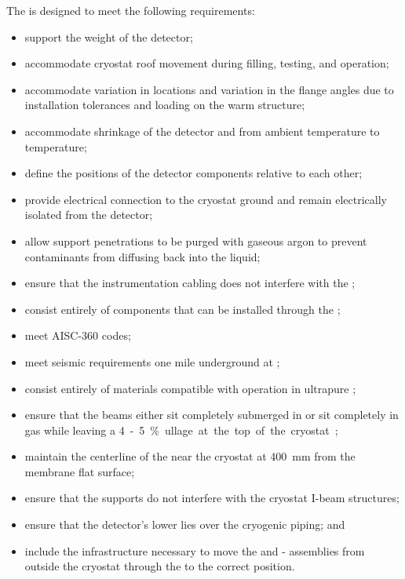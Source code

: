 The  is designed to meet the following  requirements:
\begin{itemize}
\item support the weight of the detector;
\item accommodate cryostat roof movement during filling, testing, and operation;
\item accommodate variation in \fdth locations and
  variation in the flange angles due to installation tolerances and
  loading on the warm structure;
\item accommodate shrinkage of the detector and  from ambient
  temperature to  temperature;
\item define the positions of the detector components relative to each other; 
\item provide electrical connection to the cryostat ground and remain electrically isolated from the detector;
\item allow support penetrations to be purged with gaseous argon to prevent contaminants from diffusing back into the liquid; 
\item ensure that the instrumentation cabling does not interfere with the ;
\item consist entirely of components that can  
be installed through the ;
\item meet AISC-360 codes; 
\item meet seismic requirements one mile underground at ;
\item consist entirely of materials compatible %
with operation in ultrapure ;
\item ensure that the  beams either sit completely submerged in  or sit completely in gas while leaving a \SI{4}-\SI{5}{\%} ullage at the top of the cryostat;  
\item maintain the centerline of the  near the cryostat at \SI{400}{mm} from the membrane flat surface;
\item ensure that the supports do not interfere with the cryostat I-beam structures;
\item ensure that the detector's lower  lies over the cryogenic piping; and
\item include the infrastructure necessary to move the  and - assemblies from outside the cryostat through the  to the correct position.
\end{itemize}

